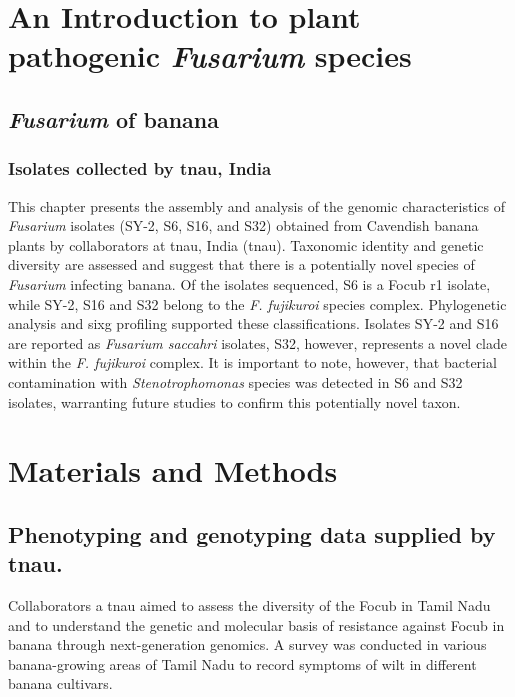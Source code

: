 
\section{An Introduction to plant pathogenic \textit{Fusarium} species}




\subsection{\textit{Fusarium} of banana}


\subsubsection{Isolates collected by \acl{tnau}, India}

This chapter presents the assembly and analysis of the genomic characteristics of \textit{Fusarium} isolates (SY-2, S6, S16, and S32) obtained from Cavendish banana plants by collaborators at \acl{tnau}, India (\acs{tnau}). Taxonomic identity and genetic diversity are assessed and suggest that there is a potentially novel species of \textit{Fusarium} infecting banana. Of the isolates sequenced, S6 is a \ac{Focub} \ac{r1} isolate, while SY-2, S16 and S32 belong to the \textit{F. fujikuroi} species complex. Phylogenetic analysis and \ac{sixg} profiling supported these classifications. Isolates SY-2 and S16 are reported as \textit{Fusarium saccahri} isolates, S32, however, represents a novel clade within the \textit{F. fujikuroi} complex. It is important to note, however, that bacterial contamination with \textit{Stenotrophomonas} species was detected in S6 and S32 isolates, warranting future studies to confirm this potentially novel taxon.


\section{Materials and Methods}
\subsection{Phenotyping and genotyping data supplied by \acl{tnau}.}

Collaborators a \ac{tnau} aimed to assess the diversity of the \ac{Focub} in Tamil Nadu and to understand the genetic and molecular basis of resistance against \ac{Focub} in banana through next-generation genomics. A survey was conducted in various banana-growing areas of Tamil Nadu to record symptoms of wilt in different banana cultivars. 

